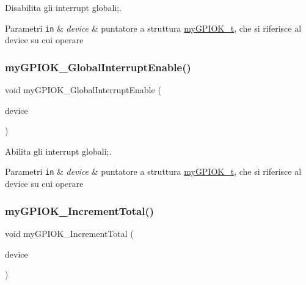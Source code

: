Disabilita gli interrupt globali;. 


\begin{DoxyParams}[1]{Parametri}
\mbox{\tt in}  & {\em device} & puntatore a struttura \hyperlink{structmy_g_p_i_o_k__t}{my\+G\+P\+I\+O\+K\+\_\+t}, che si riferisce al device su cui operare \\
\hline
\end{DoxyParams}
\mbox{\label{group__my_g_p_i_o_k__t_ga00a24f28b49c71aaa91f66be71a3895b}} 
\subsubsection{\texorpdfstring{my\+G\+P\+I\+O\+K\+\_\+\+Global\+Interrupt\+Enable()}{myGPIOK\_GlobalInterruptEnable()}}
{\footnotesize\ttfamily void my\+G\+P\+I\+O\+K\+\_\+\+Global\+Interrupt\+Enable (\begin{DoxyParamCaption}\item[{\hyperlink{structmy_g_p_i_o_k__t}{my\+G\+P\+I\+O\+K\+\_\+t} $\ast$}]{device }\end{DoxyParamCaption})}



Abilita gli interrupt globali;. 


\begin{DoxyParams}[1]{Parametri}
\mbox{\tt in}  & {\em device} & puntatore a struttura \hyperlink{structmy_g_p_i_o_k__t}{my\+G\+P\+I\+O\+K\+\_\+t}, che si riferisce al device su cui operare \\
\hline
\end{DoxyParams}
\mbox{\label{group__my_g_p_i_o_k__t_ga5a7df448de9de94620ce1baf7ec388c9}} 
\subsubsection{\texorpdfstring{my\+G\+P\+I\+O\+K\+\_\+\+Increment\+Total()}{myGPIOK\_IncrementTotal()}}
{\footnotesize\ttfamily void my\+G\+P\+I\+O\+K\+\_\+\+Increment\+Total (\begin{DoxyParamCaption}\item[{\hyperlink{structmy_g_p_i_o_k__t}{my\+G\+P\+I\+O\+K\+\_\+t} $\ast$}]{device }\end{DoxyParamCaption})}



